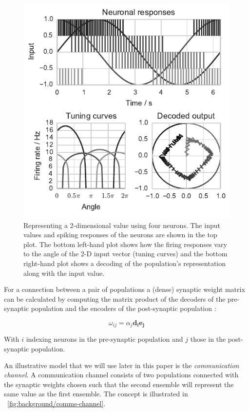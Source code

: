 \documentclass[conference]{IEEEtran}
\renewcommand{\vec}{\mathbf}  %
\begin{document}
  \begin{figure}[!t]
    \includegraphics{figures/nef-1}
    \caption{Representing a 2-dimensional value using four neurons. The input values and spiking responses of the neurons are shown in the top plot. The bottom left-hand plot shows how the firing responses vary to the angle of the 2-D input vector (tuning curves) and the bottom right-hand plot shows a decoding of the population's representation along with the input value.}
    \label{fig:background/nef-1}
  \end{figure}

For a connection between a pair of populations a (dense) synaptic weight matrix can be calculated by computing the matrix product of the decoders of the pre-synaptic population and the encoders of the post-synaptic population \parencite{Stewart2014}:

\begin{equation}
  \omega_{ij} = \alpha_j \vec{d_i}\vec{e_j}  \label{eq:weights}
\end{equation}

With $i$ indexing neurons in the pre-synaptic population and $j$ those in the post-synaptic population.

An illustrative model that we will use later in this paper is the \textit{communication channel}.
  A communication channel consists of two populations connected with the synaptic weights chosen such that the second ensemble will represent the same value as the first ensemble.
  The concept is illustrated in \figurename~\ref{fig:background/comms-channel}.
\end{document}
